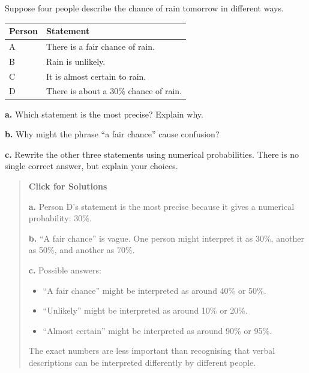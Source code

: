 \documentclass[
  letterpaper,
  DIV=11,
  numbers=noendperiod]{scrreprt}
\providecommand{\tightlist}{%
  \setlength{\itemsep}{0pt}\setlength{\parskip}{0pt}}
\begin{document}
\begin{tcolorbox}[enhanced jigsaw, arc=.35mm, bottomrule=.15mm, bottomtitle=1mm, breakable, colback=white, colbacktitle=quarto-callout-note-color!10!white, colframe=quarto-callout-note-color-frame, coltitle=black, left=2mm, leftrule=.75mm, opacityback=0, opacitybacktitle=0.6, rightrule=.15mm, title=\textcolor{quarto-callout-note-color}{\faInfo}\hspace{0.5em}{Question 3}, titlerule=0mm, toprule=.15mm, toptitle=1mm]

Suppose four people describe the chance of rain tomorrow in different
ways.

\begin{table}
\fontsize{12.0pt}{14.0pt}\selectfont
\begin{tabular*}{\linewidth}{@{\extracolsep{\fill}}ll}
\toprule
Person & Statement \\ 
\midrule\addlinespace[2.5pt]
A & There is a fair chance of rain. \\ 
B & Rain is unlikely. \\ 
C & It is almost certain to rain. \\ 
D & There is about a 30\% chance of rain. \\ 
\bottomrule
\end{tabular*}
\end{table}

\textbf{a.} Which statement is the most precise? Explain why.

\textbf{b.} Why might the phrase ``a fair chance'' cause confusion?

\textbf{c.} Rewrite the other three statements using numerical
probabilities. There is no single correct answer, but explain your
choices.

\begin{quote}
\textbf{Click for Solutions}

\textbf{a.} Person D's statement is the most precise because it gives a
numerical probability: 30\%.

\textbf{b.} ``A fair chance'' is vague. One person might interpret it as
30\%, another as 50\%, and another as 70\%.

\textbf{c.} Possible answers:

\begin{itemize}
\tightlist
\item
  ``A fair chance'' might be interpreted as around 40\% or 50\%.
\item
  ``Unlikely'' might be interpreted as around 10\% or 20\%.
\item
  ``Almost certain'' might be interpreted as around 90\% or 95\%.
\end{itemize}

The exact numbers are less important than recognising that verbal
descriptions can be interpreted differently by different people.
\end{quote}

\end{tcolorbox}
\end{document}
